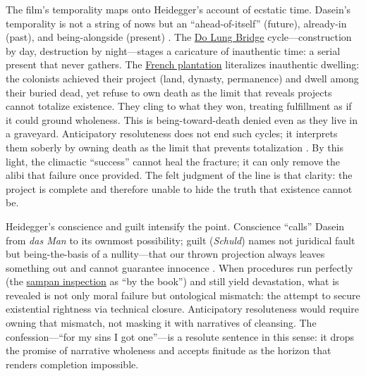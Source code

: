 The film's temporality maps onto Heidegger's account of ecstatic time. Dasein's temporality is
not a string of nows but an ``ahead-of-itself'' (future), already-in (past), and being-alongside
(present) \parencite[pp.~373--383]{HeideggerBT1962}. The \hyperref[scene:do-lung-bridge]{Do
	Lung Bridge} cycle—construction by day, destruction by night—stages a caricature of inauthentic
time: a serial present that never gathers. The \hyperref[scene:french-plantation]{French
	plantation} literalizes inauthentic
dwelling: the colonists achieved their project (land, dynasty, permanence) and dwell among
their buried dead, yet refuse to own death as the limit that reveals projects cannot totalize
existence. They cling to what they won, treating fulfillment as if it could ground wholeness.
This is being-toward-death denied even as they live in a graveyard. Anticipatory resoluteness
does not end such cycles; it interprets them soberly by owning death as the limit that
prevents totalization \parencite[pp.~307--311]{HeideggerBT1962}. By this light, the climactic
``success'' cannot heal the fracture; it can only remove the alibi that failure once provided.
The felt judgment of the line is that clarity: the project is complete and therefore unable to
hide the truth that existence cannot be.

Heidegger's conscience and guilt intensify the point. Conscience ``calls'' Dasein from \emph{das
	Man} to its ownmost possibility; guilt (\emph{Schuld}) names not juridical fault but
being-the-basis of a nullity—that our thrown projection always leaves something out and cannot
guarantee innocence \parencite[\S\S 57--60, pp.~311--354]{HeideggerBT1962}. When procedures run
perfectly (the \hyperref[scene:sampan]{sampan inspection} as ``by the book'') and still yield
devastation, what is revealed is not only moral failure but ontological mismatch: the attempt
to secure existential rightness via technical closure. Anticipatory resoluteness would require
owning that mismatch, not masking it with narratives of cleansing. The confession—``for my
sins I got one''—is a resolute sentence in this sense: it drops the promise of narrative
wholeness and accepts
finitude as the horizon that renders completion impossible.
